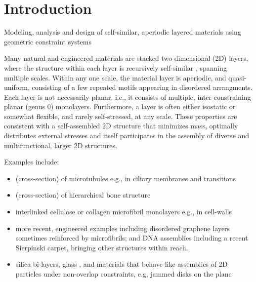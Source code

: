 \section{Introduction}
Modeling, analysis and design of self-similar, aperiodic layered materials using geometric constraint systems
 

Many natural and engineered materials are stacked two dimensional (2D) layers, where the structure within each layer is recursively 
self-similar \cite{Intro1}, 
spanning multiple scales. Within any one scale, the material layer is aperiodic, and quasi-uniform,
consisting of a few repeated motifs appearing in disordered arrangments.
Each layer is not necessarily planar, i.e., it consists of multiple, inter-constraining planar (genus 0) monolayers. 
Furthermore, a layer is often   either isostatic or somewhat flexible, and rarely self-stressed, at any scale. These properties are
consistent with a self-assembled 2D structure that minimizes mass, optimally distributes external stresses and itself 
participates in the assembly of diverse and multifunctional, 
larger 2D structures.

Examples include:

\begin{itemize}
    
    \item (cross-section) of microtubules \cite{Necklace1} e.g., in ciliary membranes and transitions \cite{Necklace2}
    
    \item (cross-section) of hierarchical bone structure \cite{XX}
    
    \item interlinked cellulose or collagen microfibril monolayers e.g., in cell-walls \cite{CellWalls1} \cite{CellWalls1}
    
    \item more recent, engineered examples including  disordered graphene layers \cite{Graphene1} \cite{Graphene2} sometimes reinforced 
    by  microfibrils; and DNA assemblies \cite{Microfibrils1} including a recent Sierpinski carpet, bringing other structures 
    \cite{Microfibrils2} within reach.
    
    \item  silica bi-layers, glass \cite{SilicaGlass1} \cite{SilicaGlass2}, and materials that behave like assemblies of 
    2D particles under non-overlap constraints, e.g, jammed 
    disks on the plane \cite{JammedDisk1}

   
\end{itemize}


